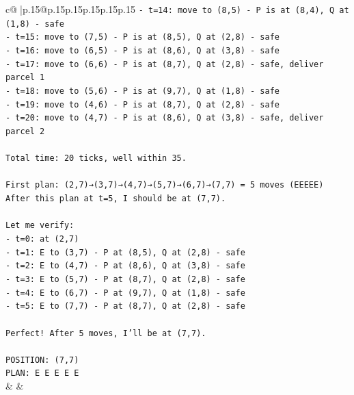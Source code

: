 \documentclass{article}
\begin{document}
{\begin{supertabular}{c@{$\;$}|p{.15\linewidth}@{}p{.15\linewidth}p{.15\linewidth}p{.15\linewidth}p{.15\linewidth}p{.15\linewidth}}
{{{\texttt{{-} t=14: move to (8,5) {-} P is at (8,4), Q at (1,8) {-} safe} \\
\texttt{{-} t=15: move to (7,5) {-} P is at (8,5), Q at (2,8) {-} safe} \\
\texttt{{-} t=16: move to (6,5) {-} P is at (8,6), Q at (3,8) {-} safe} \\
\texttt{{-} t=17: move to (6,6) {-} P is at (8,7), Q at (2,8) {-} safe, deliver parcel 1} \\
\texttt{{-} t=18: move to (5,6) {-} P is at (9,7), Q at (1,8) {-} safe} \\
\texttt{{-} t=19: move to (4,6) {-} P is at (8,7), Q at (2,8) {-} safe} \\
\texttt{{-} t=20: move to (4,7) {-} P is at (8,6), Q at (3,8) {-} safe, deliver parcel 2} \\
\\ 
\texttt{Total time: 20 ticks, well within 35.} \\
\\ 
\texttt{First plan: (2,7)→(3,7)→(4,7)→(5,7)→(6,7)→(7,7) = 5 moves (EEEEE)} \\
\texttt{After this plan at t=5, I should be at (7,7).} \\
\\ 
\texttt{Let me verify:} \\
\texttt{{-} t=0: at (2,7)} \\
\texttt{{-} t=1: E to (3,7) {-} P at (8,5), Q at (2,8) {-} safe} \\
\texttt{{-} t=2: E to (4,7) {-} P at (8,6), Q at (3,8) {-} safe} \\
\texttt{{-} t=3: E to (5,7) {-} P at (8,7), Q at (2,8) {-} safe} \\
\texttt{{-} t=4: E to (6,7) {-} P at (9,7), Q at (1,8) {-} safe} \\
\texttt{{-} t=5: E to (7,7) {-} P at (8,7), Q at (2,8) {-} safe} \\
\\ 
\texttt{Perfect! After 5 moves, I'll be at (7,7).} \\
\\ 
\texttt{POSITION: (7,7)} \\
\texttt{PLAN: E E E E E} \\
            }
        }
    }
    & & \\ \\


\end{supertabular}}
\end{document}

